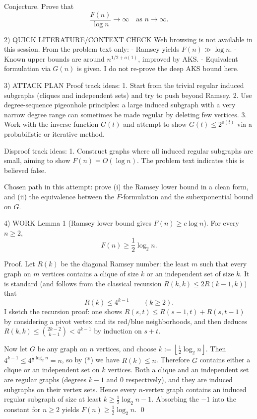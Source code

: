 Conjecture.
Prove that
\[\frac{F(n)}{\log n}\to\infty\quad\text{as }n\to\infty.\]

2) QUICK LITERATURE/CONTEXT CHECK
Web browsing is not available in this session.
From the problem text only:
- Ramsey yields $F(n)\gg\log n$.
- Known upper bounds are around $n^{1/2+o(1)}$, improved by AKS.
- Equivalent formulation via $G(n)$ is given.
I do not re-prove the deep AKS bound here.

3) ATTACK PLAN
Proof track ideas:
1. Start from the trivial regular induced subgraphs (cliques and independent sets) and try to push beyond Ramsey.
2. Use degree-sequence pigeonhole principles: a large induced subgraph with a very narrow degree range can sometimes be made regular by deleting few vertices.
3. Work with the inverse function $G(t)$ and attempt to show $G(t)\le 2^{o(t)}$ via a probabilistic or iterative method.

Disproof track ideas:
1. Construct graphs where all induced regular subgraphs are small, aiming to show $F(n)=O(\log n)$.
The problem text indicates this is believed false.

Chosen path in this attempt: prove (i) the Ramsey lower bound in a clean form, and (ii) the equivalence between the $F$-formulation and the subexponential bound on $G$.

4) WORK
Lemma 1 (Ramsey lower bound gives $F(n)\ge c\log n$).
For every $n\ge 2$,
\[F(n)\ge \frac12\log_2 n.\]

Proof.
Let $R(k)$ be the diagonal Ramsey number: the least $m$ such that every graph on $m$ vertices contains a clique of size $k$ or an independent set of size $k$.
It is standard (and follows from the classical recursion $R(k,k)\le 2R(k-1,k)$) that
\[R(k)\le 4^{k-1}\qquad(k\ge 2).\tag{*}\]
I sketch the recursion proof: one shows $R(s,t)\le R(s-1,t)+R(s,t-1)$ by considering a pivot vertex and its red/blue neighborhoods, and then deduces
$R(k,k)\le \binom{2k-2}{k-1}<4^{k-1}$ by induction on $s+t$.

Now let $G$ be any graph on $n$ vertices, and choose $k:=\left\lfloor \frac12\log_2 n\right\rfloor$.
Then $4^{k-1}\le 4^{\frac12\log_2 n}=n$, so by (*) we have $R(k)\le n$.
Therefore $G$ contains either a clique or an independent set on $k$ vertices.
Both a clique and an independent set are regular graphs (degrees $k-1$ and $0$ respectively), and they are induced subgraphs on their vertex sets.
Hence every $n$-vertex graph contains an induced regular subgraph of size at least $k\ge \frac12\log_2 n-1$.
Absorbing the $-1$ into the constant for $n\ge 2$ yields $F(n)\ge \frac12\log_2 n$. \qed

